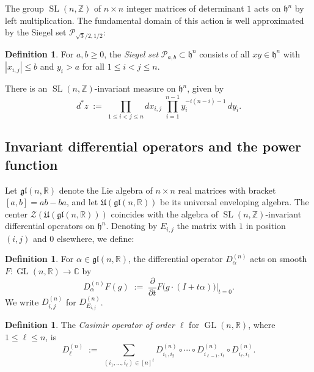 \documentclass[12pt, reqno, oneside]{amsart}
\theoremstyle{definition}
\newtheorem{definition}[theorem]{Definition}
\numberwithin{equation}{section}
\newcommand{\Z}{\mathbb{Z}}
\newcommand{\R}{\mathbb{R}}
\newcommand{\C}{\mathbb{C}}
\newcommand{\hh}{\mathfrak{h}}
\newcommand{\gl}{\mathfrak{gl}}
\DeclareMathOperator{\GL}{GL}
\DeclareMathOperator{\SL}{SL}
\begin{document}
The group $\SL(n,\Z)$ of $n\times n$ integer matrices of determinant $1$
acts on $\hh^n$ by left multiplication. The fundamental domain of this
action is well approximated by the Siegel set $\mathcal{P}_{\sqrt{3}/2,1/2}$:

\begin{definition}
For $a,b\geq 0$, the \emph{Siegel set} $\mathcal{P}_{a,b}\subset\hh^n$
consists of all $xy\in\hh^n$ with $|x_{i,j}|\leq b$ and $y_i>a$ for all
$1\leq i<j\leq n$.
\end{definition}

There is an $\SL(n,\Z)$-invariant measure on $\hh^n$, given by
\begin{equation}\label{eq:measure}
  d^*z \;:=\;
  \prod_{1\leq i<j\leq n} dx_{i,j}
  \;\prod_{i=1}^{n-1} y_i^{-i(n-i)-1}\,dy_i.
\end{equation}

\subsection{Invariant differential operators and the power function}

Let $\gl(n,\R)$ denote the Lie algebra of $n\times n$ real matrices with
bracket $[a,b]=ab-ba$, and let $\mathfrak{U}(\gl(n,\R))$ be its universal
enveloping algebra. The center $\mathcal{Z}(\mathfrak{U}(\gl(n,\R)))$
coincides with the algebra of $\SL(n,\Z)$-invariant differential operators
on $\hh^n$. Denoting by $E_{i,j}$ the matrix with $1$ in position $(i,j)$
and $0$ elsewhere, we define:

\begin{definition}\label{def:diff-op}
For $\alpha\in\gl(n,\R)$, the differential operator $D_\alpha^{(n)}$ acts
on smooth $F:\GL(n,\R)\to\C$ by
\[
  D_\alpha^{(n)} F(g)
  \;:=\;
  \frac{\partial}{\partial t} F\bigl(g\cdot(I+t\alpha)\bigr)\Big|_{t=0}.
\]
We write $D_{i,j}^{(n)}$ for $D_{E_{i,j}}^{(n)}$.
\end{definition}

\begin{definition}\label{def:casimir}
The \emph{Casimir operator of order $\ell$} for $\GL(n,\R)$, where
$1\leq\ell\leq n$, is
\begin{equation}\label{eq:casimir}
  D_\ell^{(n)}
  \;:=\;
  \sum_{(i_1,\ldots,i_\ell)\in[n]^\ell}
  D_{i_1,i_2}^{(n)}\circ\cdots\circ D_{i_{\ell-1},i_\ell}^{(n)}
  \circ D_{i_\ell,i_1}^{(n)}.
\end{equation}
\end{definition}
\end{document}
